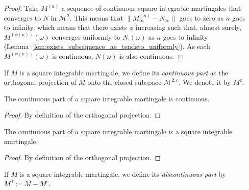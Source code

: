 \begin{proof}
  \leanok
Take $M^{(n)}$ a sequence of continuous square integrable martingales that converges to $N$ in $\mathcal{M}^2$. This means that $\|M^{(n)}_\infty - N_\infty\|$ goes to zero as $n$ goes to infinity, which means that there exists $\phi$ increasing such that, almost surely, $M^{(\phi(n))}_\cdot(\omega)$ converges uniformly to $N_\cdot(\omega)$ as $n$ goes to infinity (Lemma~\ref{lem:exists_subsequence_ae_tendsto_uniformly}). As each $M^{(\phi(n))}(\omega)$ is continuous, $N(\omega)$ is also continuous.
\end{proof}


\begin{definition}\label{def:continuousPartSquareIntegrable}
  \leanok
If $M$ is a square integrable martingale, we define its \emph{continuous part} as the orthogonal projection of $M$ onto the closed subspace $\mathcal{M}^{2,c}$. We denote it by $M^c$.
\end{definition}


\begin{lemma}\label{lem:continuous_continuousPart}
  \leanok
The continuous part of a square integrable martingale is continuous.
\end{lemma}

\begin{proof}
  \leanok
By definition of the orthogonal projection.
\end{proof}


\begin{lemma}\label{lem:isSquareIntegrable_continuousPart}
  \leanok
The continuous part of a square integrable martingale is a square integrable martingale.
\end{lemma}

\begin{proof}
  \leanok
By definition of the orthogonal projection.
\end{proof}


\begin{definition}\label{def:discontinuousPart}
  \leanok
If $M$ is a square integrable martingale, we define its \emph{discontinuous part} by $M^d := M - M^c$.
\end{definition}


